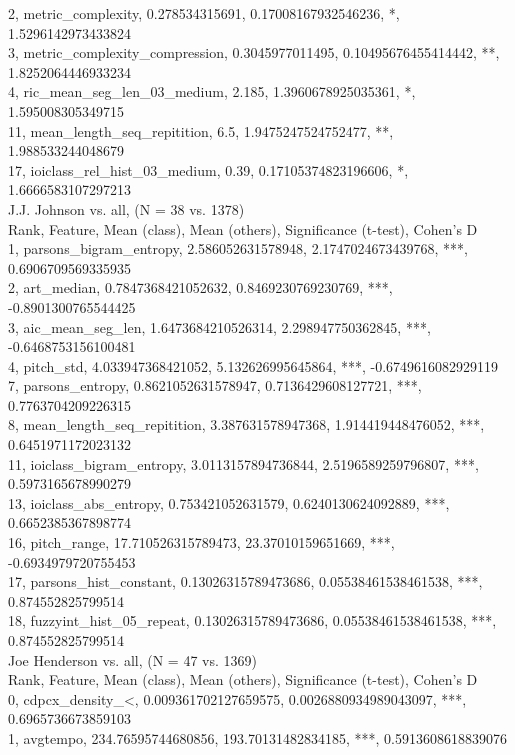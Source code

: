 2, metric_complexity, 0.278534315691, 0.17008167932546236, *, 1.5296142973433824\\
3, metric_complexity_compression, 0.3045977011495, 0.10495676455414442, **, 1.8252064446933234\\
4, ric_mean_seg_len_03_medium, 2.185, 1.3960678925035361, *, 1.595008305349715\\
11, mean_length_seq_repitition, 6.5, 1.9475247524752477, **, 1.988533244048679\\
17, ioiclass_rel_hist_03_medium, 0.39, 0.17105374823196606, *, 1.6666583107297213\\
J.J. Johnson vs. all, (N = 38 vs. 1378)\\
Rank, Feature, Mean (class), Mean (others), Significance (t-test), Cohen's D\\
1, parsons_bigram_entropy, 2.586052631578948, 2.1747024673439768, ***, 0.6906709569335935\\
2, art_median, 0.7847368421052632, 0.8469230769230769, ***, -0.8901300765544425\\
3, aic_mean_seg_len, 1.6473684210526314, 2.298947750362845, ***, -0.6468753156100481\\
4, pitch_std, 4.033947368421052, 5.132626995645864, ***, -0.6749616082929119\\
7, parsons_entropy, 0.8621052631578947, 0.7136429608127721, ***, 0.7763704209226315\\
8, mean_length_seq_repitition, 3.387631578947368, 1.914419448476052, ***, 0.6451971172023132\\
11, ioiclass_bigram_entropy, 3.0113157894736844, 2.5196589259796807, ***, 0.5973165678990279\\
13, ioiclass_abs_entropy, 0.753421052631579, 0.6240130624092889, ***, 0.6652385367898774\\
16, pitch_range, 17.710526315789473, 23.37010159651669, ***, -0.6934979720755453\\
17, parsons_hist_constant, 0.13026315789473686, 0.05538461538461538, ***, 0.874552825799514\\
18, fuzzyint_hist_05_repeat, 0.13026315789473686, 0.05538461538461538, ***, 0.874552825799514\\
Joe Henderson vs. all, (N = 47 vs. 1369)\\
Rank, Feature, Mean (class), Mean (others), Significance (t-test), Cohen's D\\
0, cdpcx_density_<, 0.009361702127659575, 0.0026880934989043097, ***, 0.6965736673859103\\
1, avgtempo, 234.76595744680856, 193.70131482834185, ***, 0.5913608618839076\\
